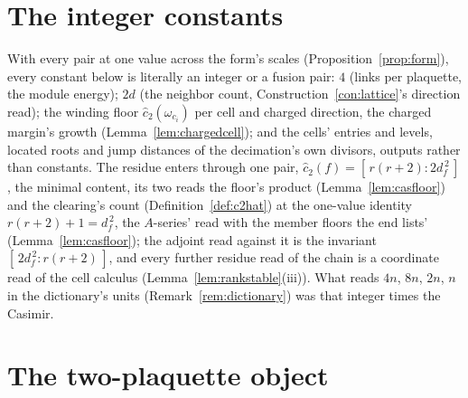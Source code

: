 \documentclass[11pt]{article}
\theoremstyle{definition}
\begin{document}
\section{The integer constants}

With every pair at one value across the form's scales
(Proposition~\ref{prop:form}), every
constant below is literally an integer or a fusion pair: $4$ (links
per plaquette, the module energy); $2d$ (the neighbor count,
Construction~\ref{con:lattice}'s direction read); the winding floor $\hat c_2(\omega_{c_i})$ per cell and charged
direction, the charged margin's growth (Lemma~\ref{lem:chargedcell}); and the cells'
entries and levels, located roots and jump distances of the decimation's own
divisors, outputs rather than constants. The residue enters through
one pair, $\hat c_2(f)=[\,r(r+2):2d_f^{\,2}\,]$, the minimal content,
its two reads the floor's product (Lemma~\ref{lem:casfloor}) and the
clearing's count (Definition~\ref{def:c2hat}) at the one-value
identity $r(r+2)+1=d_f^{\,2}$, the $A$-series' read with the
member floors the end lists' (Lemma~\ref{lem:casfloor}); the
adjoint read against it is the
invariant $[\,2d_f^{\,2}:r(r+2)\,]$, and every further residue read of
the chain is a coordinate read of the cell calculus
(Lemma~\ref{lem:rankstable}(iii)).
What reads $4n$, $8n$, $2n$, $n$ in the dictionary's units
(Remark~\ref{rem:dictionary}) was that integer times the Casimir.

\section{The two-plaquette object}
\end{document}
